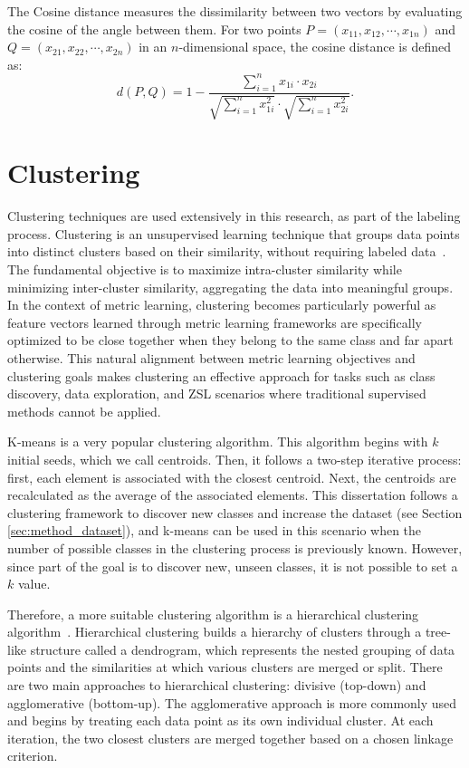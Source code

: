 The Cosine distance measures the dissimilarity between two vectors by evaluating the cosine of the angle between them. For two points $P = (x_{11}, x_{12}, \cdots, x_{1n})$ and $Q = (x_{21}, x_{22}, \cdots, x_{2n})$ in an $n$-dimensional space, the cosine distance is defined as:
\begin{equation}
d(P,Q) = 1 - \frac{\sum_{i=1}^{n} x_{1i} \cdot x_{2i}}{\sqrt{\sum_{i=1}^{n} x_{1i}^2} \cdot \sqrt{\sum_{i=1}^{n} x_{2i}^2}}.
\end{equation}

\section{Clustering}
\label{sec:clustering}

Clustering techniques are used extensively in this research, as part of the labeling process. Clustering is an unsupervised learning technique that groups data points into distinct clusters based on their similarity, without requiring labeled data~\cite{bishop_pattern_2006}. The fundamental objective is to maximize intra-cluster similarity while minimizing inter-cluster similarity, aggregating the data into meaningful groups. In the context of metric learning, clustering becomes particularly powerful as feature vectors learned through metric learning frameworks are specifically optimized to be close together when they belong to the same class and far apart otherwise. This natural alignment between metric learning objectives and clustering goals makes clustering an effective approach for tasks such as class discovery, data exploration, and \gls{ZSL} scenarios where traditional supervised methods cannot be applied.

K-means \cite{macqueen_methods_1967,lloyd_least_1982} is a very popular clustering algorithm. This algorithm begins with $k$ initial seeds, which we call centroids. Then, it follows a two-step iterative process: first, each element is associated with the closest centroid. Next, the centroids are recalculated as the average of the associated elements. This dissertation follows a clustering framework to discover new classes and increase the dataset (see Section \ref{sec:method_dataset}), and k-means can be used in this scenario when the number of possible classes in the clustering process is previously known. However, since part of the goal is to discover new, unseen classes, it is not possible to set a $k$ value.

Therefore, a more suitable clustering algorithm is a hierarchical clustering algorithm~\cite{ward_jr_hierarchical_1963}. Hierarchical clustering builds a hierarchy of clusters through a tree-like structure called a dendrogram, which represents the nested grouping of data points and the similarities at which various clusters are merged or split. There are two main approaches to hierarchical clustering: divisive (top-down) and agglomerative (bottom-up). The agglomerative approach is more commonly used and begins by treating each data point as its own individual cluster. At each iteration, the two closest clusters are merged together based on a chosen linkage criterion.

